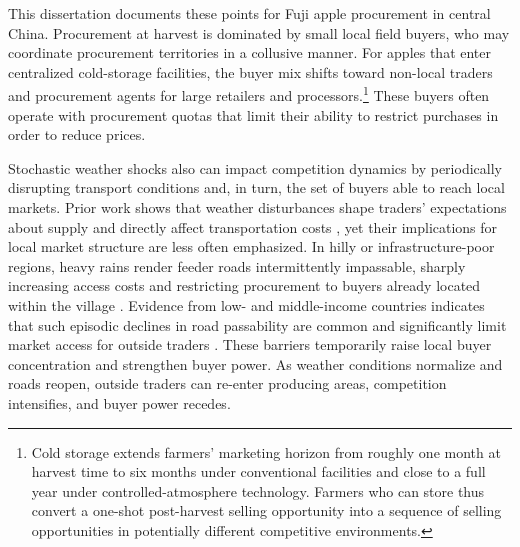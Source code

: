 This dissertation documents these points for Fuji apple procurement in central China. Procurement at harvest is dominated by small local field buyers, who may coordinate procurement territories in a collusive manner. For apples that enter centralized cold-storage facilities, the buyer mix shifts toward non-local traders and procurement agents for large retailers and processors.\footnote{Cold storage extends farmers' marketing horizon from roughly one month at harvest time to six months under conventional facilities and close to a full year under controlled-atmosphere technology. Farmers who can store thus convert a one-shot post-harvest selling opportunity into a sequence of selling opportunities in potentially different competitive environments.} These buyers often operate with procurement quotas that limit their ability to restrict purchases in order to reduce prices.

Stochastic weather shocks also can impact competition dynamics by periodically disrupting transport conditions and, in turn, the set of buyers able to reach local markets. Prior work shows that weather disturbances shape traders' expectations about supply \citep{letta2022weather} and directly affect transportation costs \citep{mitchell2025effects}, yet their implications for local market structure are less often emphasized. In hilly or infrastructure-poor regions, heavy rains render feeder roads intermittently impassable, sharply increasing access costs and restricting procurement to buyers already located within the village \citep{dappe2024shrinking}. Evidence from low- and middle-income countries indicates that such episodic declines in road passability are common and significantly limit market access for outside traders \citep{greenham2023transport}. These barriers temporarily raise local buyer concentration and strengthen buyer power. As weather conditions normalize and roads reopen, outside traders can re-enter producing areas, competition intensifies, and buyer power recedes.



